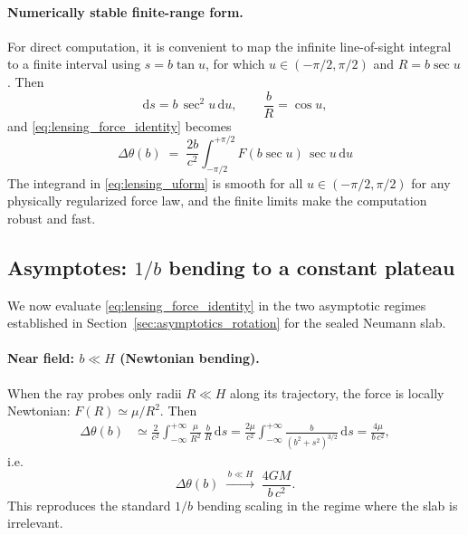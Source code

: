 \documentclass[11pt]{article}
\newcommand{\dd}{\mathrm{d}}
\begin{document}
\paragraph{Numerically stable finite-range form.}
For direct computation, it is convenient to map the infinite line-of-sight integral to a finite
interval using $s=b\tan u$, for which $u\in(-\pi/2,\pi/2)$ and $R=b\sec u$.  Then
\begin{equation}
  \dd s = b\,\sec^2 u\,\dd u,
  \qquad
  \frac{b}{R} = \cos u,
\end{equation}
and \eqref{eq:lensing_force_identity} becomes
\begin{equation}
  \boxed{
  \Delta\theta(b)
  \;=\;
  \frac{2b}{c^2}\int_{-\pi/2}^{+\pi/2} F\!\left(b\sec u\right)\,\sec u\,\dd u
  }
  \label{eq:lensing_uform}
\end{equation}
The integrand in \eqref{eq:lensing_uform} is smooth for all $u\in(-\pi/2,\pi/2)$ for any physically
regularized force law, and the finite limits make the computation robust and fast.

\subsection{Asymptotes: $1/b$ bending to a constant plateau}
\label{sec:lensing_asymptotes}

We now evaluate \eqref{eq:lensing_force_identity} in the two asymptotic regimes established in
Section~\ref{sec:asymptotics_rotation} for the sealed Neumann slab.

\paragraph{Near field: $b\ll H$ (Newtonian bending).}
When the ray probes only radii $R\ll H$ along its trajectory, the force is locally Newtonian:
$F(R)\simeq \mu/R^2$.
Then
\begin{align}
  \Delta\theta(b)
  &\simeq \frac{2}{c^2}\int_{-\infty}^{+\infty}
  \frac{\mu}{R^2}\,\frac{b}{R}\,\dd s
  = \frac{2\mu}{c^2}\int_{-\infty}^{+\infty}
  \frac{b}{(b^2+s^2)^{3/2}}\,\dd s
  = \frac{4\mu}{b\,c^2},
\end{align}
i.e.
\begin{equation}
  \Delta\theta(b)\;\xrightarrow{\,b\ll H\,}\; \frac{4GM}{b\,c^2}.
  \label{eq:lensing_newtonian}
\end{equation}
This reproduces the standard $1/b$ bending scaling in the regime where the slab is irrelevant.
\end{document}

